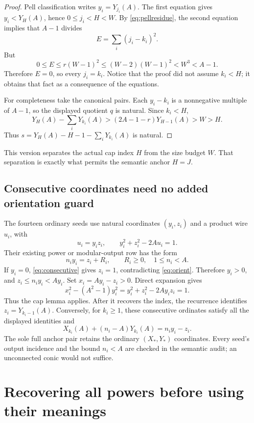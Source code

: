 \documentclass[11pt,a4paper]{article}
\theoremstyle{remark}
\begin{document}
\begin{proof}
Pell classification writes \(y_i=Y_{j_i}(A)\). The first equation gives
\(y_i<Y_H(A)\), hence \(0\le j_i<H<W\). By \eqref{eq:pellresidue},
the second equation implies that \(A-1\) divides
\[
 E=\sum_i(j_i-k_i)^2.
\]
But
\[
 0\le E\le r(W-1)^2\le(W-2)(W-1)^2<W^3<A-1.
\]
Therefore \(E=0\), so every \(j_i=k_i\). Notice that the proof did not
assume \(k_i<H\); it obtains that fact as a consequence of the equations.

For completeness take the canonical pairs. Each \(y_i-k_i\) is a
nonnegative multiple of \(A-1\), so the displayed quotient \(q\) is
natural. Since \(k_i<H\),
\[
 Y_H(A)-\sum_iY_{k_i}(A)
 >(2A-1-r)Y_{H-1}(A)>W>H.
\]
Thus \(s=Y_H(A)-H-1-\sum_iY_{k_i}(A)\) is natural.
\end{proof}

This version separates the actual cap index \(H\) from the size budget
\(W\). That separation is exactly what permits the semantic anchor
\(H=J\).

\subsection{Consecutive coordinates need no added orientation guard}

The fourteen ordinary seeds use natural coordinates \((y_i,z_i)\) and
a product wire \(u_i\), with
\begin{equation}\label{eq:consecutive}
 u_i=y_iz_i,\qquad y_i^2+z_i^2-2Au_i=1.
\end{equation}
Their existing power or modular-output row has the form
\begin{equation}\label{eq:orient}
 n_i y_i=z_i+R_i,
 \qquad R_i\ge0,\quad 1\le n_i<A.
\end{equation}
If \(y_i=0\), \eqref{eq:consecutive} gives \(z_i=1\), contradicting
\eqref{eq:orient}. Therefore \(y_i>0\), and
\(z_i\le n_iy_i<Ay_i\). Set \(x_i=Ay_i-z_i>0\). Direct expansion gives
\[
 x_i^2-(A^2-1)y_i^2=y_i^2+z_i^2-2Ay_iz_i=1.
\]
Thus the cap lemma applies. After it recovers the index, the recurrence
identifies \(z_i=Y_{k_i-1}(A)\). Conversely, for \(k_i\ge1\), these
consecutive ordinates satisfy all the displayed identities and
\[
 X_{k_i}(A)+(n_i-A)Y_{k_i}(A)=n_iy_i-z_i.
\]
The sole full anchor pair retains the ordinary \((X_*,Y_*)\) coordinates.
Every seed's output incidence and the bound \(n_i<A\) are checked in the
semantic audit; an unconnected conic would not suffice.

\section{Recovering all powers before using their meanings}
\end{document}
